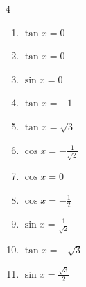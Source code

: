 \begin{multicols}{4}
\begin{enumerate}
  \item $\displaystyle \tan{x}  = 0$

        \phantom{$\displaystyle x = 0 , \pi$}

  \item $\displaystyle \tan{x}  = 0$

        \phantom{$\displaystyle x = 0 , \pi$}

  \item $\displaystyle \sin{x}  = 0$

        \phantom{$\displaystyle x = 0 , \pi$}

  \item $\displaystyle \tan{x}  = -1$


  \item $\displaystyle \tan{x}  = \sqrt{3}$


  \item $\displaystyle \cos{x}  = -\frac{1}{\sqrt{2}}$


  \item $\displaystyle \cos{x}  = 0$


\columnbreak %

\resetques

  \item $\displaystyle \cos{x}  = -\frac{1}{2}$


  \item $\displaystyle \sin{x}  = \frac{1}{\sqrt{2}}$


  \item $\displaystyle \tan{x}  = -\sqrt{3}$


  \item $\displaystyle \sin{x}  = \frac{\sqrt{3}}{2}$



\end{enumerate}
\end{multicols}
